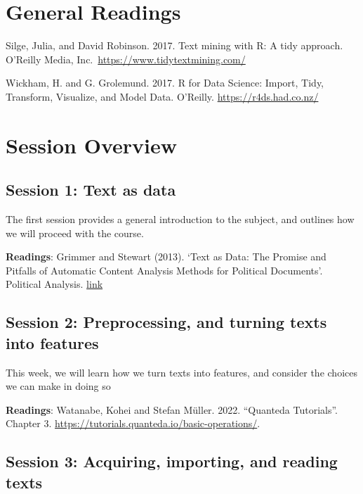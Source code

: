 \documentclass[
]{article}
\begin{document}
\hypertarget{general-readings}{%
\section{General Readings}\label{general-readings}}

Silge, Julia, and David Robinson. 2017. Text mining with R: A tidy
approach. O'Reilly Media, Inc.~\url{https://www.tidytextmining.com/}

Wickham, H. and G. Grolemund. 2017. R for Data Science: Import, Tidy,
Transform, Visualize, and Model Data. O'Reilly.
\url{https://r4ds.had.co.nz/}

\hypertarget{session-overview}{%
\section{Session Overview}\label{session-overview}}

\hypertarget{session-1-text-as-data}{%
\subsection{Session 1: Text as data}\label{session-1-text-as-data}}

The first session provides a general introduction to the subject, and
outlines how we will proceed with the course.

\textbf{Readings}: Grimmer and Stewart (2013). `Text as Data: The
Promise and Pitfalls of Automatic Content Analysis Methods for Political
Documents'. Political Analysis.
\href{https://www.cambridge.org/core/journals/political-analysis/article/text-as-data-the-promise-and-pitfalls-of-automatic-content-analysis-methods-for-political-texts/F7AAC8B2909441603FEB25C156448F20}{link}

\hypertarget{session-2-preprocessing-and-turning-texts-into-features}{%
\subsection{Session 2: Preprocessing, and turning texts into
features}\label{session-2-preprocessing-and-turning-texts-into-features}}

This week, we will learn how we turn texts into features, and consider
the choices we can make in doing so

\textbf{Readings}: Watanabe, Kohei and Stefan Müller. 2022. ``Quanteda
Tutorials''. Chapter 3.
\url{https://tutorials.quanteda.io/basic-operations/}.

\hypertarget{session-3-acquiring-importing-and-reading-texts}{%
\subsection{Session 3: Acquiring, importing, and reading
texts}\label{session-3-acquiring-importing-and-reading-texts}}
\end{document}
